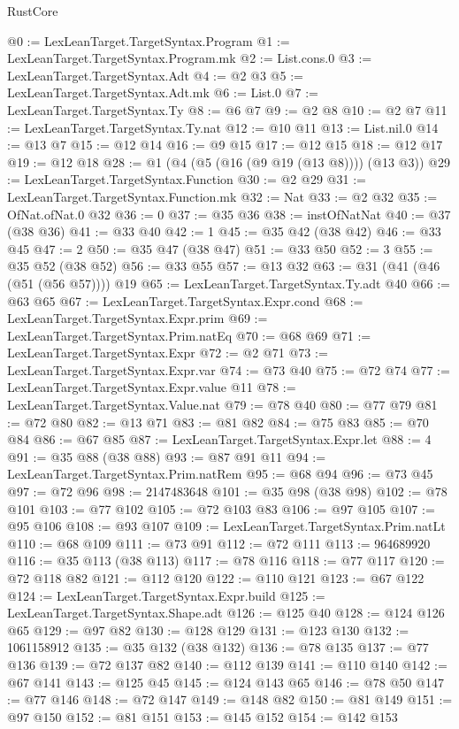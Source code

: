 \begin{lexlean}{RustCore}
\begin{coremodule}
@0 := LexLeanTarget.TargetSyntax.Program
@1 := LexLeanTarget.TargetSyntax.Program.mk
@2 := List.cons.{0}
@3 := LexLeanTarget.TargetSyntax.Adt
@4 := @2 @3
@5 := LexLeanTarget.TargetSyntax.Adt.mk
@6 := List.{0}
@7 := LexLeanTarget.TargetSyntax.Ty
@8 := @6 @7
@9 := @2 @8
@10 := @2 @7
@11 := LexLeanTarget.TargetSyntax.Ty.nat
@12 := @10 @11
@13 := List.nil.{0}
@14 := @13 @7
@15 := @12 @14
@16 := @9 @15
@17 := @12 @15
@18 := @12 @17
@19 := @12 @18
@28 := @1 (@4 (@5 (@16 (@9 @19 (@13 @8)))) (@13 @3))
@29 := LexLeanTarget.TargetSyntax.Function
@30 := @2 @29
@31 := LexLeanTarget.TargetSyntax.Function.mk
@32 := Nat
@33 := @2 @32
@35 := OfNat.ofNat.{0} @32
@36 := 0
@37 := @35 @36
@38 := instOfNatNat
@40 := @37 (@38 @36)
@41 := @33 @40
@42 := 1
@45 := @35 @42 (@38 @42)
@46 := @33 @45
@47 := 2
@50 := @35 @47 (@38 @47)
@51 := @33 @50
@52 := 3
@55 := @35 @52 (@38 @52)
@56 := @33 @55
@57 := @13 @32
@63 := @31 (@41 (@46 (@51 (@56 @57)))) @19
@65 := LexLeanTarget.TargetSyntax.Ty.adt @40
@66 := @63 @65
@67 := LexLeanTarget.TargetSyntax.Expr.cond
@68 := LexLeanTarget.TargetSyntax.Expr.prim
@69 := LexLeanTarget.TargetSyntax.Prim.natEq
@70 := @68 @69
@71 := LexLeanTarget.TargetSyntax.Expr
@72 := @2 @71
@73 := LexLeanTarget.TargetSyntax.Expr.var
@74 := @73 @40
@75 := @72 @74
@77 := LexLeanTarget.TargetSyntax.Expr.value @11
@78 := LexLeanTarget.TargetSyntax.Value.nat
@79 := @78 @40
@80 := @77 @79
@81 := @72 @80
@82 := @13 @71
@83 := @81 @82
@84 := @75 @83
@85 := @70 @84
@86 := @67 @85
@87 := LexLeanTarget.TargetSyntax.Expr.let
@88 := 4
@91 := @35 @88 (@38 @88)
@93 := @87 @91 @11
@94 := LexLeanTarget.TargetSyntax.Prim.natRem
@95 := @68 @94
@96 := @73 @45
@97 := @72 @96
@98 := 2147483648
@101 := @35 @98 (@38 @98)
@102 := @78 @101
@103 := @77 @102
@105 := @72 @103 @83
@106 := @97 @105
@107 := @95 @106
@108 := @93 @107
@109 := LexLeanTarget.TargetSyntax.Prim.natLt
@110 := @68 @109
@111 := @73 @91
@112 := @72 @111
@113 := 964689920
@116 := @35 @113 (@38 @113)
@117 := @78 @116
@118 := @77 @117
@120 := @72 @118 @82
@121 := @112 @120
@122 := @110 @121
@123 := @67 @122
@124 := LexLeanTarget.TargetSyntax.Expr.build
@125 := LexLeanTarget.TargetSyntax.Shape.adt
@126 := @125 @40
@128 := @124 @126 @65
@129 := @97 @82
@130 := @128 @129
@131 := @123 @130
@132 := 1061158912
@135 := @35 @132 (@38 @132)
@136 := @78 @135
@137 := @77 @136
@139 := @72 @137 @82
@140 := @112 @139
@141 := @110 @140
@142 := @67 @141
@143 := @125 @45
@145 := @124 @143 @65
@146 := @78 @50
@147 := @77 @146
@148 := @72 @147
@149 := @148 @82
@150 := @81 @149
@151 := @97 @150
@152 := @81 @151
@153 := @145 @152
@154 := @142 @153

\end{coremodule}
\end{lexlean}
